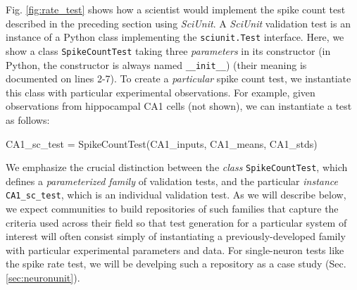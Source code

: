 \documentclass[11pt,letterpaper]{article}
\let\verbx\lstinline
\begin{document}
Fig. \ref{fig:rate_test} shows how a scientist would implement the spike count test described in the preceding section using \textit{SciUnit}. A \textit{SciUnit} validation test is an {instance} of a Python class implementing the \verbx{sciunit.Test} interface. Here, we show a class \verbx{SpikeCountTest} taking three \emph{parameters} in its constructor (in Python, the constructor is always named \verbx{__init__}) (their meaning is documented on lines 2-7). To create a \emph{particular} spike count test, we instantiate this class with particular experimental observations. For example, given observations from hippocampal CA1 cells (not shown), we can instantiate a test as follows:
\begin{python}
  CA1_sc_test = SpikeCountTest(CA1_inputs, CA1_means, CA1_stds)
\end{python}
We emphasize the crucial distinction between the \textit{class} \verbx{SpikeCountTest}, which defines a \emph{parameterized family} of validation tests, and the particular \textit{instance} \verbx{CA1_sc_test}, which is an individual validation test. As we will describe below, we expect communities to build repositories of such families that capture the criteria used across their field so that test generation for a particular system of interest will often consist simply of instantiating a previously-developed family with particular experimental parameters and data. For single-neuron tests like the spike rate test, we will be develping such a repository as a case study (Sec. \ref{sec:neuronunit}). 
\end{document}
